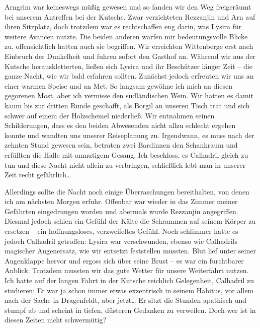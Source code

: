 \documentclass[11pt]{scrreprt}
\begin{document}
Arngrim war keineswegs müßig gewesen und so fanden wir den Weg freigeräumt bei unserem Antreffen bei der Kutsche. Zwar verzichteten Rezzanjin und Arn auf ihren Sitzplatz, doch trotzdem war es rechtschaffen eng darin, was Lysira für weitere Avancen nutzte. Die beiden anderen warfen mir bedeutungsvolle Blicke zu, offensichtlich hatten auch sie begriffen. Wir erreichten Wittenberge erst nach Einbruch der Dunkelheit und fuhren sofort den Gasthof an. Während wir aus der Kutsche herauskletterten, ließen sich Lysira und ihr Beschützer länger Zeit – die ganze Nacht, wie wir bald erfahren sollten. Zunächst jedoch erfreuten wir uns an einer warmen Speise und an Met. So langsam gewöhne ich mich an diesen gegorenen Most, aber ich vermisse den südländischen Wein. Wir hatten es damit kaum bis zur dritten Runde geschafft, als Borgil an unseren Tisch trat und sich schwer auf einem der Holzschemel niederließ. Wir entnahmen seinen Schilderungen, dass es den beiden Abwesenden nicht allzu schlecht ergehen konnte und wandten uns unserer Reiseplanung zu. Irgendwann, es muss nach der zehnten Stund gewesen sein, betraten zwei Bardinnen den Schankraum und erfüllten die Halle mit anmutigem Gesang. Ich beschloss, es Calhadril gleich zu tun und diese Nacht nicht allein zu verbringen, schließlich lebt man in unserer Zeit recht gefährlich…\par

Allerdings sollte die Nacht noch einige Überraschungen bereithalten, von denen ich am nächsten Morgen erfuhr. Offenbar war wieder in das Zimmer meiner Gefährten eingedrungen worden und abermals wurde Rezzanjin angegriffen. Diesmal jedoch schien ein Gefühl der Kälte die Schrammen auf seinem Körper zu ersetzen – ein hoffnungsloses, verzweifeltes Gefühl. Noch schlimmer hatte es jedoch Calhadril getroffen: Lysira war verschwunden, ebenso wie Calhadrils magischer Augenersatz, wie wir entsetzt feststellen mussten. Blut lief unter seiner Augenklappe hervor und ergoss sich über seine Brust – es war ein furchtbarer Anblick. Trotzdem mussten wir das gute Wetter für unsere Weiterfahrt nutzen. Ich hatte auf der langen Fahrt in der Kutsche reichlich Gelegenheit, Calhadril zu studieren: Er war ja schon immer etwas exzentrisch in seinem Habitus, vor allem nach der Sache in Dragenfeldt, aber jetzt… Er sitzt die Stunden apathisch und stumpf ab und scheint in tiefen, düsteren Gedanken zu verweilen. Doch wer ist in diesen Zeiten nicht schwermütig?\par
\end{document}
